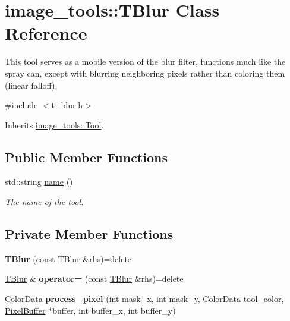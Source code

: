 \hypertarget{classimage__tools_1_1TBlur}{}\section{image\+\_\+tools\+:\+:T\+Blur Class Reference}
\label{classimage__tools_1_1TBlur}


This tool serves as a mobile version of the blur filter, functions much like the spray can, except with blurring neighboring pixels rather than coloring them (linear falloff).  




{\ttfamily \#include $<$t\+\_\+blur.\+h$>$}



Inherits \hyperlink{classimage__tools_1_1Tool}{image\+\_\+tools\+::\+Tool}.

\subsection*{Public Member Functions}
\begin{DoxyCompactItemize}
\item 
std\+::string \hyperlink{classimage__tools_1_1TBlur_a9277f8a68498ab7eb27977ae369d1c69}{name} ()
\begin{DoxyCompactList}\small\item\em The name of the tool. \end{DoxyCompactList}\end{DoxyCompactItemize}
\subsection*{Private Member Functions}
\begin{DoxyCompactItemize}
\item 
{\bfseries T\+Blur} (const \hyperlink{classimage__tools_1_1TBlur}{T\+Blur} \&rhs)=delete\hypertarget{classimage__tools_1_1TBlur_a5f9e4791a94be35cc27f3e242ce8b5db}{}\label{classimage__tools_1_1TBlur_a5f9e4791a94be35cc27f3e242ce8b5db}

\item 
\hyperlink{classimage__tools_1_1TBlur}{T\+Blur} \& {\bfseries operator=} (const \hyperlink{classimage__tools_1_1TBlur}{T\+Blur} \&rhs)=delete\hypertarget{classimage__tools_1_1TBlur_a3a6baeb4da03df232efbed9b2e2c8a03}{}\label{classimage__tools_1_1TBlur_a3a6baeb4da03df232efbed9b2e2c8a03}

\item 
\hyperlink{classimage__tools_1_1ColorData}{Color\+Data} {\bfseries process\+\_\+pixel} (int mask\+\_\+x, int mask\+\_\+y, \hyperlink{classimage__tools_1_1ColorData}{Color\+Data} tool\+\_\+color, \hyperlink{classimage__tools_1_1PixelBuffer}{Pixel\+Buffer} $\ast$buffer, int buffer\+\_\+x, int buffer\+\_\+y)\hypertarget{classimage__tools_1_1TBlur_ab3e88d9759fccf2ceb1c70a7c76c8dbc}{}\label{classimage__tools_1_1TBlur_ab3e88d9759fccf2ceb1c70a7c76c8dbc}

\end{DoxyCompactItemize}
